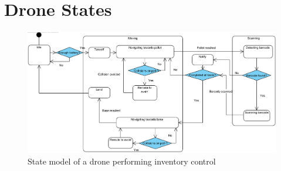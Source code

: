 \chapter{Drone States}
\label{app:drone_states}

\begin{figure}[h]
	\centering
	\includegraphics[width=\textwidth, angle=-90]{img/drone_states.png}
	\caption{State model of a drone performing inventory control}
	\label{fig:drone_states}
\end{figure}